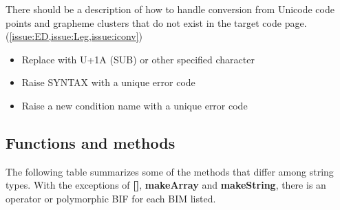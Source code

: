 \documentclass[b4paper]{article}
\begin{document}
There should be a description of how to handle conversion from Unicode code
points and grapheme clusters that do not exist in the target code page.
(\cref{issue:ED,issue:Leg,issue:iconv})
\begin{itemize}
\item Replace with U+1A (SUB) or other specified character
\item Raise SYNTAX with a unique error code
\item Raise a new condition name with a unique error code
\end{itemize}

\subsection{Functions and methods}
The following table summarizes some of the methods that differ among string types.
With the exceptions of \textbf{{[}{]}}, \textbf{makeArray} and \textbf{makeString},
there is an operator or polymorphic BIF for each BIM listed.
\end{document}
